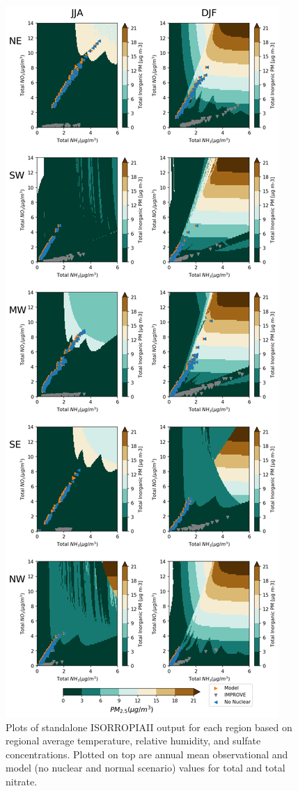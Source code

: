\documentclass[12]{article}
\begin{document}
\begin{figure}[!htbp]
    \centering
    \includegraphics[height=0.95\textheight]{ego_nonuclear_project/Figures/isorropia_obs_plot.png}
    \caption{Plots of standalone ISORROPIAII output for each region based on regional average temperature, relative humidity, and sulfate concentrations. Plotted on top are annual mean observational and model (no nuclear and normal scenario) values for total  and total nitrate.} 
    \label{fig:isorropia}
\end{figure}
\end{document}

